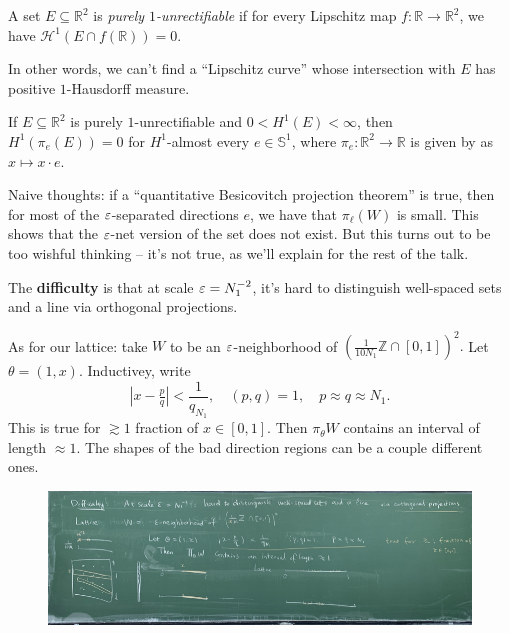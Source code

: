 \documentclass[reqno]{amsart} 
\numberwithin{theorem}{section}
\numberwithin{equation}{section}
\begin{document}
\begin{definition}
  A set $E \subseteq \mathbb{R}^2$ is \emph{purely $1$-unrectifiable} if for every Lipschitz map $f : \mathbb{R} \rightarrow \mathbb{R}^2$, we have $\mathcal{H}^1(E \cap f(\mathbb{R})) = 0$.
\end{definition}
In other words, we can't find a ``Lipschitz curve'' whose intersection with $E$ has positive $1$-Hausdorff measure.

\begin{theorem}
  If $E \subseteq \mathbb{R}^2$ is purely $1$-unrectifiable and $0 < H^1(E) < \infty$, then $H^1(\pi_e(E)) = 0$ for $H^1$-almost every $e \in \mathbb{S}^1$, where $\pi_e : \mathbb{R}^2 \rightarrow \mathbb{R}$ is given by as $x \mapsto x \cdot e$.
\end{theorem}
Naive thoughts: if a ``quantitative Besicovitch projection theorem'' is true, then for most of the $\varepsilon$-separated directions $e$, we have that $\pi_{\ell}(W)$ is small.  This shows that the $\varepsilon$-net version of the set does not exist.  But this turns out to be too wishful thinking -- it's not true, as we'll explain for the rest of the talk.

The \textbf{difficulty} is that at scale $\varepsilon = N_1^{- 2}$, it's hard to distinguish well-spaced sets and a line via orthogonal projections.

As for our lattice: take $W$ to be an $\varepsilon$-neighborhood of $ \left( \frac{1}{10 N_1} \mathbb{Z} \cap[0, 1] \right)^2.$  Let $\theta =(1, x)$.  Inductivey, write
\begin{equation*}
  \left\lvert x - \tfrac{p}{q}
  \right\rvert < \frac{1}{q_{N_1}}, \quad(p, q) = 1, \quad p \approx q \approx N_1.
\end{equation*}
This is true for $\gtrsim 1$ fraction of $x \in[0, 1]$.  Then $\pi_\theta W$ contains an interval of length $\approx 1$.  The shapes of the bad direction regions can be a couple different ones.

\begin{figure}
  \centering
  \includegraphics[width=1.0\textwidth]{images/img_20250430_153653}
\end{figure}
\end{document}
